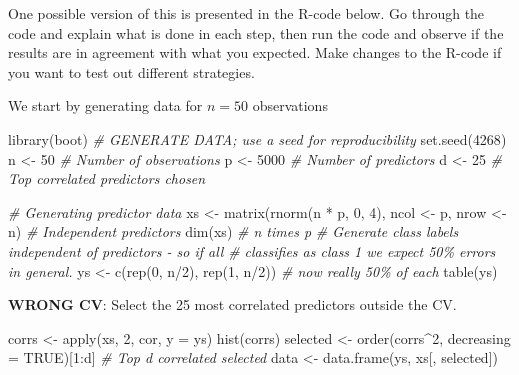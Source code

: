 \documentclass[
]{article}
\newenvironment{Shaded}{\begin{snugshade}}{\end{snugshade}}
\newcommand{\AttributeTok}[1]{\textcolor[rgb]{0.77,0.63,0.00}{#1}}
\newcommand{\CommentTok}[1]{\textcolor[rgb]{0.56,0.35,0.01}{\textit{#1}}}
\newcommand{\ConstantTok}[1]{\textcolor[rgb]{0.00,0.00,0.00}{#1}}
\newcommand{\DecValTok}[1]{\textcolor[rgb]{0.00,0.00,0.81}{#1}}
\newcommand{\FunctionTok}[1]{\textcolor[rgb]{0.00,0.00,0.00}{#1}}
\newcommand{\NormalTok}[1]{#1}
\newcommand{\OtherTok}[1]{\textcolor[rgb]{0.56,0.35,0.01}{#1}}
\newcommand{\SpecialCharTok}[1]{\textcolor[rgb]{0.00,0.00,0.00}{#1}}
\begin{document}
One possible version of this is presented in the R-code below. Go
through the code and explain what is done in each step, then run the
code and observe if the results are in agreement with what you expected.
Make changes to the R-code if you want to test out different strategies.

We start by generating data for \(n=50\) observations

\begin{Shaded}
\begin{Highlighting}[]
\FunctionTok{library}\NormalTok{(boot)}
\CommentTok{\# GENERATE DATA; use a seed for reproducibility}
\FunctionTok{set.seed}\NormalTok{(}\DecValTok{4268}\NormalTok{)}
\NormalTok{n }\OtherTok{\textless{}{-}} \DecValTok{50}  \CommentTok{\# Number of observations}
\NormalTok{p }\OtherTok{\textless{}{-}} \DecValTok{5000}  \CommentTok{\# Number of predictors}
\NormalTok{d }\OtherTok{\textless{}{-}} \DecValTok{25}  \CommentTok{\# Top correlated predictors chosen}

\CommentTok{\# Generating predictor data}
\NormalTok{xs }\OtherTok{\textless{}{-}} \FunctionTok{matrix}\NormalTok{(}\FunctionTok{rnorm}\NormalTok{(n }\SpecialCharTok{*}\NormalTok{ p, }\DecValTok{0}\NormalTok{, }\DecValTok{4}\NormalTok{), ncol }\OtherTok{\textless{}{-}}\NormalTok{ p, nrow }\OtherTok{\textless{}{-}}\NormalTok{ n)  }\CommentTok{\# Independent predictors}
\FunctionTok{dim}\NormalTok{(xs)  }\CommentTok{\# n times p}
\CommentTok{\# Generate class labels independent of predictors {-} so if all}
\CommentTok{\# classifies as class 1 we expect 50\% errors in general.}
\NormalTok{ys }\OtherTok{\textless{}{-}} \FunctionTok{c}\NormalTok{(}\FunctionTok{rep}\NormalTok{(}\DecValTok{0}\NormalTok{, n}\SpecialCharTok{/}\DecValTok{2}\NormalTok{), }\FunctionTok{rep}\NormalTok{(}\DecValTok{1}\NormalTok{, n}\SpecialCharTok{/}\DecValTok{2}\NormalTok{))  }\CommentTok{\# now really 50\% of each}
\FunctionTok{table}\NormalTok{(ys)}
\end{Highlighting}
\end{Shaded}

\textbf{WRONG CV}: Select the 25 most correlated predictors outside the
CV.

\begin{Shaded}
\begin{Highlighting}[]
\NormalTok{corrs }\OtherTok{\textless{}{-}} \FunctionTok{apply}\NormalTok{(xs, }\DecValTok{2}\NormalTok{, cor, }\AttributeTok{y =}\NormalTok{ ys)}
\FunctionTok{hist}\NormalTok{(corrs)}
\NormalTok{selected }\OtherTok{\textless{}{-}} \FunctionTok{order}\NormalTok{(corrs}\SpecialCharTok{\^{}}\DecValTok{2}\NormalTok{, }\AttributeTok{decreasing =} \ConstantTok{TRUE}\NormalTok{)[}\DecValTok{1}\SpecialCharTok{:}\NormalTok{d]  }\CommentTok{\# Top d correlated selected}
\NormalTok{data }\OtherTok{\textless{}{-}} \FunctionTok{data.frame}\NormalTok{(ys, xs[, selected])}
\end{Highlighting}
\end{Shaded}
\end{document}
